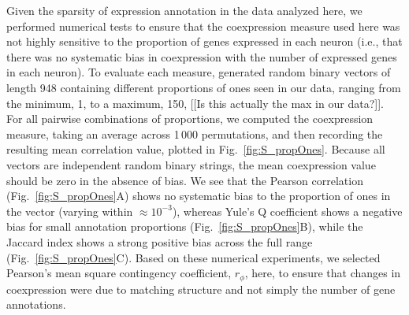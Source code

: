 \documentclass[10pt,letterpaper]{article}
\begin{document}
Given the sparsity of expression annotation in the data analyzed here, we performed numerical tests to ensure that the coexpression measure used here was not highly sensitive to the proportion of genes expressed in each neuron (i.e., that there was no systematic bias in coexpression with the number of expressed genes in each neuron).
To evaluate each measure, generated random binary vectors of length 948 containing different proportions of ones seen in our data, ranging from the minimum, 1, to a maximum, 150, [[Is this actually the max in our data?]].
For all pairwise combinations of proportions, we computed the coexpression measure, taking an average across 1\,000 permutations, and then recording the resulting mean correlation value, plotted in Fig.~\ref{fig:S_propOnes}.
Because all vectors are independent random binary strings, the mean coexpression value should be zero in the absence of bias.
We see that the Pearson correlation (Fig.~\ref{fig:S_propOnes}A) shows no systematic bias to the proportion of ones in the vector (varying within $\approx 10^{-3}$), whereas Yule's Q coefficient shows a negative bias for small annotation proportions (Fig.~\ref{fig:S_propOnes}B), while the Jaccard index shows a strong positive bias across the full range (Fig.~\ref{fig:S_propOnes}C).
Based on these numerical experiments, we selected Pearson's mean square contingency coefficient, $r_\phi$, here, to ensure that changes in coexpression were due to matching structure and not simply the number of gene annotations.




\end{document}
